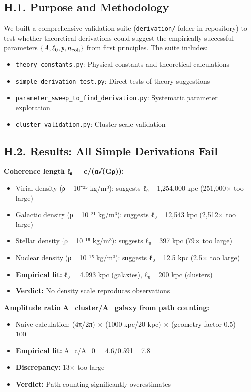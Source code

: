 \documentclass[11pt,a4paper]{article}
\begin{document}
\subsection{H.1. Purpose and Methodology}


We built a comprehensive validation suite (\texttt{derivation/} folder in repository) to test whether theoretical derivations could suggest the empirically successful parameters $\{A, \ell_0, p, n_{\rm coh}\}$ from first principles. The suite includes:


\begin{itemize}
\item \texttt{theory\_constants.py}: Physical constants and theoretical calculations
\item \texttt{simple\_derivation\_test.py}: Direct tests of theory suggestions
\item \texttt{parameter\_sweep\_to\_find\_derivation.py}: Systematic parameter exploration
\item \texttt{cluster\_validation.py}: Cluster-scale validation
\end{itemize}


\subsection{H.2. Results: All Simple Derivations Fail}


\textbf{Coherence length ℓ₀ = c/(α√(Gρ)):}

\begin{itemize}
\item Virial density (ρ ~ 10⁻²⁵ kg/m³): suggests ℓ₀ ~ 1,254,000 kpc (251,000× too large)
\item Galactic density (ρ ~ 10⁻²¹ kg/m³): suggests ℓ₀ ~ 12,543 kpc (2,512× too large)
\item Stellar density (ρ ~ 10⁻¹⁸ kg/m³): suggests ℓ₀ ~ 397 kpc (79× too large)
\item Nuclear density (ρ ~ 10⁻¹⁵ kg/m³): suggests ℓ₀ ~ 12.5 kpc (2.5× too large)
\item \textbf{Empirical fit:} ℓ₀ = 4.993 kpc (galaxies), ℓ₀ ~ 200 kpc (clusters)
\item \textbf{Verdict:} No density scale reproduces observations
\end{itemize}


\textbf{Amplitude ratio A\_cluster/A\_galaxy from path counting:}

\begin{itemize}
\item Naive calculation: (4π/2π) × (1000 kpc/20 kpc) × (geometry factor 0.5) ~ 100
\item \textbf{Empirical fit:} A\_c/A\_0 = 4.6/0.591 ~ 7.8
\item \textbf{Discrepancy:} 13× too large
\item \textbf{Verdict:} Path-counting significantly overestimates
\end{itemize}
\end{document}
